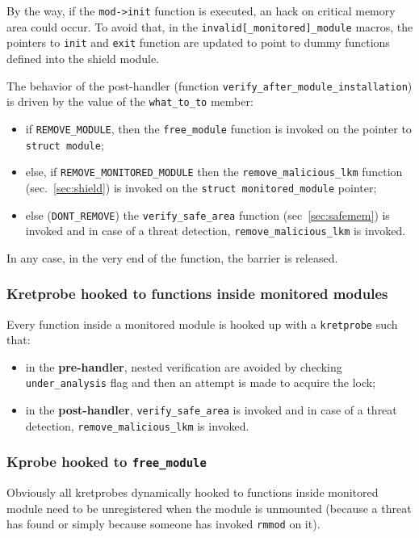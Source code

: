 \documentclass{article}
\begin{document}
	By the way, if the \texttt{mod->init} function is executed, an hack on critical memory area could occur. To avoid
	that, in the \texttt{invalid[\_monitored]\_module} macros, the pointers to \texttt{init} and \texttt{exit} function
	are updated to point to dummy functions defined into the shield module.

	The behavior of the post-handler (function \texttt{verify\_after\_module\_installation}) is driven by the value of
	the \texttt{what\_to\_to} member:
	\begin{itemize}
		\item if \texttt{REMOVE\_MODULE}, then the \texttt{free\_module} function is invoked on the pointer to
		\texttt{struct module};
		\item else, if \texttt{REMOVE\_MONITORED\_MODULE} then the \texttt{remove\_malicious\_lkm} function
		(sec.~\ref{sec:shield}) is invoked on the \texttt{struct monitored\_module} pointer;
		\item else (\texttt{DONT\_REMOVE}) the \texttt{verify\_safe\_area} function (sec~\ref{sec:safemem}) is invoked
		and in case of a threat detection, \texttt{remove\_malicious\_lkm} is invoked.
	\end{itemize}

	In any case, in the very end of the function, the barrier is released.

	\subsubsection{Kretprobe hooked to functions inside monitored modules}
	Every function inside a monitored module is hooked up with a \texttt{kretprobe} such that:
	\begin{itemize}
		\item in the \textbf{pre-handler}, nested verification are avoided by checking \texttt{under\_analysis}
		flag and then an attempt is made to acquire the lock;
		\item in the \textbf{post-handler}, \texttt{verify\_safe\_area} is invoked and in case of a threat
		detection, \texttt{remove\_malicious\_lkm} is invoked.
	\end{itemize}

	\subsubsection{Kprobe hooked to \texttt{free\_module}}
	Obviously all kretprobes dynamically hooked to functions inside monitored module need to be unregistered when the
	module is unmounted (because a threat has found or simply because someone has invoked \texttt{rmmod} on it).
\end{document}

